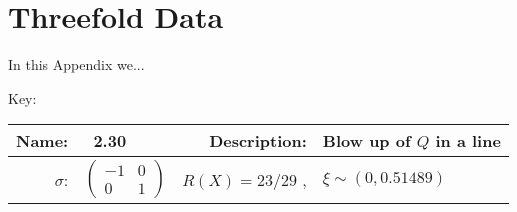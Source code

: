 \chapter{Threefold Data}
\label{appendix1}
\renewcommand{\thefootnote}{\fnsymbol{footnote}} 
\setcounter{footnote}{0}
In this Appendix we...

Key:

{\setlength{\parindent}{0pt}
\newpage
%
%
%
%
%
%
%
\begin{tabularx}{\textwidth}{rlrl}
\toprule
\textbf{Name:} & \ 2.30 \hspace{0.3\textwidth} & \textbf{Description:} & Blow up of $Q$ in a line\\
\midrule
\textbf{$\sigma$}: & {\small $\begin{pmatrix} -1 & 0 \\ 0 & 1 \end{pmatrix}$ } & $ R(X) = 23/29$ , & $\xi \sim (0,0.51489)$
\end{tabularx}

\begin{figure}[H]
\centering



\end{figure}}
